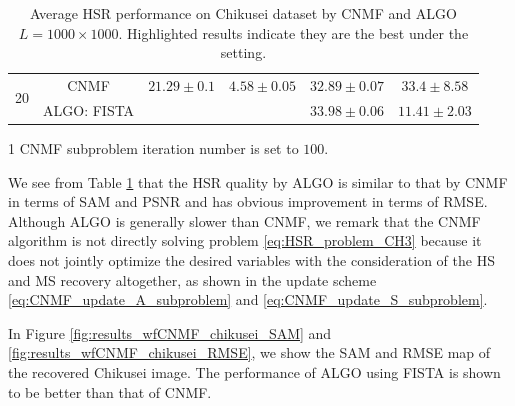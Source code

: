 \begin{table}[h]
{\begin{threeparttable}
\begin{tabular}{|c|c|c|c|c|c|}
\multirow{2}{*}{20} & CNMF\tnote{1}    &                    {$21.29    ± 0.1 $} &                    {$4.58  \pm 0.05$} &                     {$32.89 \pm 0.07$} &                     {$33.4  \pm 8.58 $}  \tabularnewline
                    & ALGO: FISTA      & \cellcolor{red! 10}{$22.44    ± 0.04$} & \cellcolor{red! 10}{$3.73  \pm 0.04$} & \cellcolor{red! 10} {$33.98 \pm 0.06$} & \cellcolor{red! 10} {$11.41 \pm 2.03 $}  \tabularnewline \hline
\end{tabular}
\begin{tablenotes}
\item[1] CNMF subproblem iteration number is set to $100$.
\end{tablenotes}
\end{threeparttable}
}
\caption{Average HSR performance on Chikusei dataset by CNMF and ALGO
         $L = 1000 \times 1000$. Highlighted results indicate they are the
         best under the setting.}
\label{table:ALGO_vs_CNMF_REAL_CHIKUSEI_MO9_MO16}
\end{table}

We see from Table \ref{table:ALGO_vs_CNMF_REAL_CHIKUSEI_MO9_MO16} that the HSR
quality by ALGO is similar to that by CNMF in terms of SAM and PSNR and has
obvious improvement in terms of RMSE.
Although ALGO is generally slower than CNMF, we remark that the CNMF algorithm
is not directly solving problem \eqref{eq:HSR_problem_CH3} because it does not
jointly optimize the desired variables with the consideration of the HS and MS
recovery altogether, as shown in the update scheme
\eqref{eq:CNMF_update_A_subproblem} and \eqref{eq:CNMF_update_S_subproblem}.

In Figure \ref{fig:results_wfCNMF_chikusei_SAM} and
\ref{fig:results_wfCNMF_chikusei_RMSE}, we show the SAM and RMSE map of the
recovered Chikusei image.
The performance of ALGO using FISTA is shown to be better than that of CNMF.

